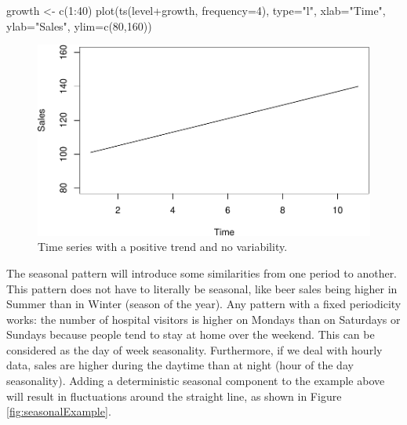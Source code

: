 \documentclass[
]{book}
\newenvironment{Shaded}{\begin{snugshade}}{\end{snugshade}}
\newcommand{\AttributeTok}[1]{\textcolor[rgb]{0.77,0.63,0.00}{#1}}
\newcommand{\DecValTok}[1]{\textcolor[rgb]{0.00,0.00,0.81}{#1}}
\newcommand{\FunctionTok}[1]{\textcolor[rgb]{0.00,0.00,0.00}{#1}}
\newcommand{\NormalTok}[1]{#1}
\newcommand{\OtherTok}[1]{\textcolor[rgb]{0.56,0.35,0.01}{#1}}
\newcommand{\SpecialCharTok}[1]{\textcolor[rgb]{0.00,0.00,0.00}{#1}}
\newcommand{\StringTok}[1]{\textcolor[rgb]{0.31,0.60,0.02}{#1}}
\theoremstyle{definition}
\theoremstyle{definition}
\theoremstyle{definition}
\theoremstyle{definition}
\theoremstyle{remark}
\begin{document}
\begin{Shaded}
\begin{Highlighting}[]
\NormalTok{growth }\OtherTok{\textless{}{-}} \FunctionTok{c}\NormalTok{(}\DecValTok{1}\SpecialCharTok{:}\DecValTok{40}\NormalTok{)}
\FunctionTok{plot}\NormalTok{(}\FunctionTok{ts}\NormalTok{(level}\SpecialCharTok{+}\NormalTok{growth, }\AttributeTok{frequency=}\DecValTok{4}\NormalTok{),}
     \AttributeTok{type=}\StringTok{"l"}\NormalTok{, }\AttributeTok{xlab=}\StringTok{"Time"}\NormalTok{, }\AttributeTok{ylab=}\StringTok{"Sales"}\NormalTok{, }\AttributeTok{ylim=}\FunctionTok{c}\NormalTok{(}\DecValTok{80}\NormalTok{,}\DecValTok{160}\NormalTok{))}
\end{Highlighting}
\end{Shaded}

\begin{figure}
\centering
\includegraphics{Svetunkov--2022----ADAM_files/figure-latex/trendExample-1.pdf}
\caption{\label{fig:trendExample}Time series with a positive trend and no variability.}
\end{figure}

The seasonal pattern will introduce some similarities from one period to another. This pattern does not have to literally be seasonal, like beer sales being higher in Summer than in Winter (season of the year). Any pattern with a fixed periodicity works: the number of hospital visitors is higher on Mondays than on Saturdays or Sundays because people tend to stay at home over the weekend. This can be considered as the day of week seasonality. Furthermore, if we deal with hourly data, sales are higher during the daytime than at night (hour of the day seasonality). Adding a deterministic seasonal component to the example above will result in fluctuations around the straight line, as shown in Figure \ref{fig:seasonalExample}.
\end{document}
